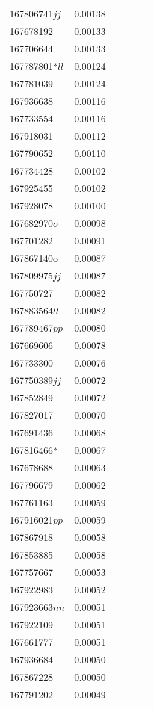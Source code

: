 \begin{landscape}
\begin{longtable}{p{1.6cm}p{1.2cm}p{1.5cm}p{1.5cm}p{2.8cm}p{13.5cm}}
167806741$jj$&0.00138&&&& \\
167678192&0.00133&&&& \\
167706644&0.00133&&&& \\
167787801*$ll$&0.00124&&&& \\
167781039&0.00124&&&& \\
167936638&0.00116&&&& \\
167733554&0.00116&&&& \\
167918031&0.00112&&&& \\
167790652&0.00110&&&& \\
167734428&0.00102&&&& \\
167925455&0.00102&&&& \\
167928078&0.00100&&&& \\
167682970$o$&0.00098&&&& \\
167701282&0.00091&&&& \\
167867140o&0.00087&&&& \\
167809975$jj$&0.00087&&&& \\
167750727&0.00082&&&& \\
167883564$ll$&0.00082&&&& \\
167789467$pp$&0.00080&&&& \\
167669606&0.00078&&&& \\
167733300&0.00076&&&& \\
167750389$jj$&0.00072&&&& \\
167852849&0.00072&&&& \\
167827017&0.00070&&&& \\
167691436&0.00068&&&& \\
167816466*&0.00067&&&& \\
167678688&0.00063&&&& \\
167796679&0.00062&&&& \\
167761163&0.00059&&&& \\
167916021$pp$&0.00059&&&& \\
167867918&0.00058&&&& \\
167853885&0.00058&&&& \\
167757667&0.00053&&&& \\
167922983&0.00052&&&& \\
167923663$nn$&0.00051&&&& \\
167922109&0.00051&&&& \\
167661777&0.00051&&&& \\
167936684&0.00050&&&& \\
167867228&0.00050&&&& \\
167791202&0.00049&&&& \\

\end{longtable}
\end{landscape}
